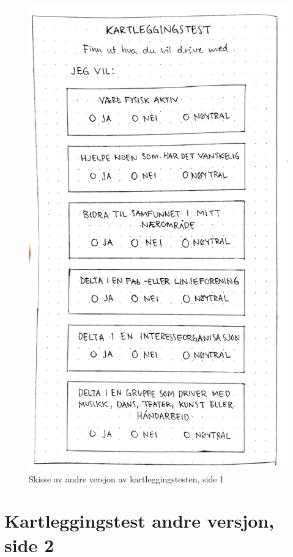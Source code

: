 \begin{figure}[H]
\centering
\includegraphics[width=.7\textwidth]{Illustrasjoner/Skisser-pdf/1.0/1-9-kartlegging-med-spm.pdf}
\caption{Skisse av andre versjon av kartleggingstesten, side 1}
\label{vedlegg:1-9-kartlegging-spm}
\end{figure}

\section{Kartleggingstest andre versjon, side 2}

